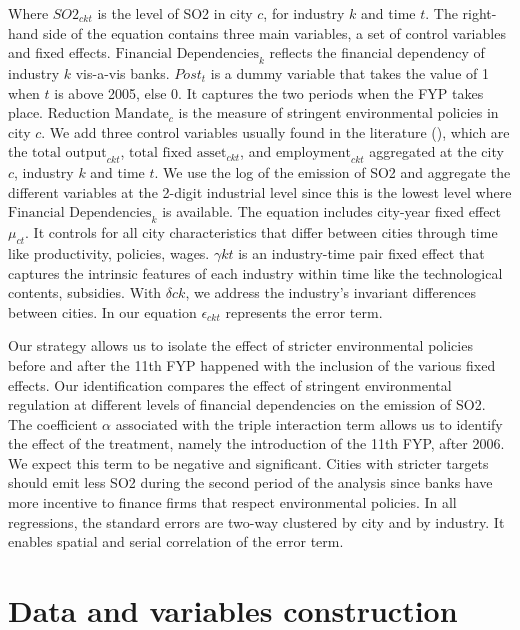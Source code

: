 \documentclass[12pt]{article}
\begin{document}
Where $SO2_{ckt}$ is the level of SO2 in city $c$, for industry $k$ and time $t$. The right-hand side of the equation contains three main variables, a set of control variables and fixed effects. $\text{Financial Dependencies}_{k}$ reflects the financial dependency of industry $k$ vis-a-vis banks. $Post_t$ is a dummy variable that takes the value of 1 when $t$ is above 2005, else 0. It captures the two periods when the FYP takes place. $\text{Reduction Mandate}_{c}$ is the measure of stringent environmental policies in city $c$. We add three control variables usually found in the literature (\cite{Andersen2015-pa, Andersen2017-wf}), which are the $\text{total output}_{ckt}$, $\text{total fixed asset}_{ckt}$, and $\text{employment}_{ckt}$ aggregated at the city $c$, industry $k$ and time $t$. We use the log of the emission of SO2 and aggregate the different variables at the 2-digit industrial level since this is the lowest level where $\text{Financial Dependencies}_{k}$ is available. The equation includes city-year fixed effect $\mu_{ct}$. It controls for all city characteristics that differ between cities through time like productivity, policies, wages. $\gamma{kt}$ is an industry-time pair fixed effect that captures the intrinsic features of each industry within time like the technological contents, subsidies. With $\delta{ck}$, we address the industry's invariant differences between cities. In our equation $\epsilon_{ckt}$ represents the error term.

Our strategy allows us to isolate the effect of stricter environmental policies before and after the 11th FYP happened with the inclusion of the various fixed effects. Our identification compares the effect of stringent environmental regulation at different levels of financial dependencies on the emission of SO2. The coefficient $\alpha$ associated with the triple interaction term allows us to identify the effect of the treatment, namely the introduction of the 11th FYP, after 2006. We expect this term to be negative and significant. Cities with stricter targets should emit less SO2 during the second period of the analysis since banks have more incentive to finance firms that respect environmental policies. In all regressions, the standard errors are two-way clustered by city and by industry. It enables spatial and serial correlation of the error term.

\section{Data and variables construction} \label{sec:Data}
\end{document}
